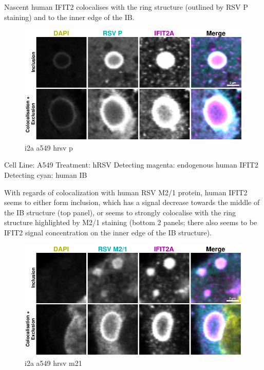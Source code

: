 Nascent human IFIT2 colocalises with the ring structure (outlined by RSV P staining) and to the inner edge of the IB.

\begin{figure}
    \centering
    \includegraphics[width=1\linewidth]{10. Chapter 5/Figs/01. Infection/02. i2a a549 hrsv p.pdf}
    \caption[i2a a549 hrsv p]{i2a a549 hrsv p}
    \label{fig:i2a a549 hrsv p}
\end{figure}

Cell Line: A549 \newline
Treatment: hRSV \newline
Detecting magenta: endogenous human IFIT2  \newline
Detecting cyan: human IB \newline

With regards of colocalization with human RSV M2/1 protein, human IFIT2 seems to either form inclusion, which has a signal decrease towards the middle of the IB structure (top panel), or seems to strongly colocalise with the ring structure highlighted by M2/1 staining (bottom 2 panels; there also seems to be IFIT2 signal concentration on the inner edge of the IB structure).

\begin{figure}
    \centering
    \includegraphics[width=1\linewidth]{10. Chapter 5/Figs/01. Infection/03. i2a a549 hrsv m21.pdf}
    \caption[i2a a549 hrsv m21]{i2a a549 hrsv m21}
    \label{fig:i2a a549 hrsv m21}
\end{figure}


